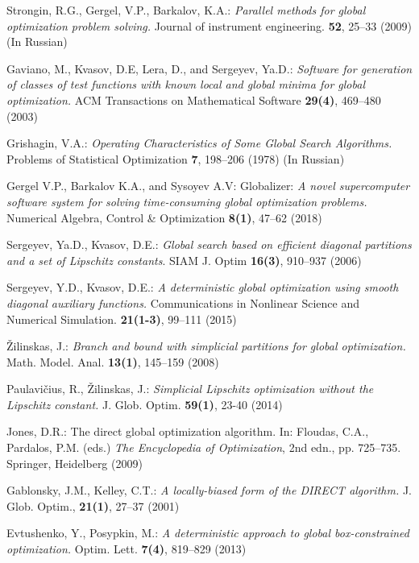 \documentclass[runningheads]{llncs}
\begin{document}
\begin{thebibliography}{107}
Strongin, R.G., Gergel, V.P., Barkalov, K.A.: \emph{Parallel methods for global optimization problem
solving.} Journal of instrument engineering. \textbf{52}, 25--33 (2009) (In Russian)

Gaviano, M., Kvasov, D.E, Lera, D., and Sergeyev, Ya.D.: \emph{Software for generation of classes
of test functions with known local and global minima for global optimization.} ACM
Transactions on Mathematical Software \textbf{29(4)}, 469--480 (2003)

Grishagin, V.A.: \emph{Operating Characteristics of Some Global Search Algorithms.} Problems of
Statistical Optimization \textbf{7}, 198--206 (1978) (In Russian)

Gergel V.P., Barkalov K.A., and Sysoyev A.V: Globalizer: \emph{A novel supercomputer software
system for solving time-consuming global optimization problems.} Numerical Algebra, Control
\& Optimization \textbf{8(1)}, 47--62 (2018)

Sergeyev, Ya.D., Kvasov, D.E.: \emph{Global search based on efficient diagonal partitions and a set
of Lipschitz constants}. SIAM J. Optim \textbf{16(3)}, 910--937 (2006)

Sergeyev, Y.D., Kvasov, D.E.: \emph{A deterministic global optimization using smooth diagonal
auxiliary functions.} Communications in Nonlinear Science and Numerical Simulation. \textbf{21(1-3)},
99--111 (2015)

\v Zilinskas, J.: \emph{Branch and bound with simplicial partitions for global optimization.} Math.
Model. Anal. \textbf{13(1)}, 145--159 (2008)

Paulavi\v cius, R., \v Zilinskas, J.: \emph{Simplicial Lipschitz optimization without the Lipschitz
constant.} J. Glob. Optim. \textbf{59(1)}, 23-40 (2014)

Jones, D.R.: The direct global optimization algorithm. In: Floudas, C.A., Pardalos, P.M.
(eds.) \emph{The Encyclopedia of Optimization}, 2nd edn., pp. 725--735. Springer, Heidelberg
(2009)

Gablonsky, J.M., Kelley, C.T.: \emph{A locally-biased form of the DIRECT algorithm.} J. Glob.
Optim., \textbf{21(1)}, 27--37 (2001)

Evtushenko, Y., Posypkin, M.: \emph{A deterministic approach to global box-constrained
optimization.} Optim. Lett. \textbf{7(4)}, 819--829 (2013)

\end{thebibliography}
\end{document}

